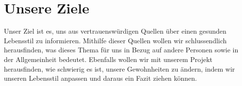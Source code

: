 \chapter{Unsere Ziele}
\authortoc{\bastian}{\chapterident}
Unser Ziel ist es, uns aus vertrauenswürdigen Quellen über einen gesunden Lebensstil zu informieren. Mithilfe dieser Quellen wollen wir schlussendlich herausfinden, was dieses Thema für uns in Bezug auf andere Personen sowie in der Allgemeinheit bedeutet. Ebenfalls wollen wir mit unserem Projekt herausfinden, wie schwierig es ist, unsere Gewohnheiten zu ändern, indem wir unseren Lebensstil anpassen und daraus ein Fazit ziehen können.